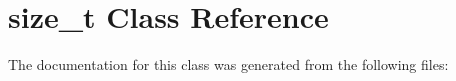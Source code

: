 \hypertarget{classsize__t}{}\section{size\+\_\+t Class Reference}
\label{classsize__t}


The documentation for this class was generated from the following files\+: